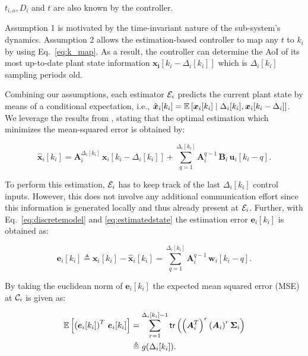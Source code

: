 \begin{theorem}
  $t_{i,o}, D_i$ and $t$ are also known by the controller. 
\end{theorem}

Assumption 1 is motivated by the time-invariant nature of the sub-system's
dynamics. Assumption 2 allows the estimation-based controller to map any $t$ to
$k_i$ by using Eq.~\eqref{eq:k_map}. As a result, the controller can determine
the AoI of its most up-to-date plant state information $\boldsymbol{x_i}[k_i -
\Delta_i[k_i]]$ which is $\Delta_i[k_i]$ sampling periods old.

Combining our assumptions, each estimator $\mathcal{E}_i$ predicts the current
plant state by means of a conditional expectation, i.e.,
$\hat{\boldsymbol{x}}_i[k_i] = \mathbb{E}\left[\boldsymbol{x}_i[k_i] \mid \Delta_i[k_i],
\boldsymbol{x}_i[k_i-\Delta_i] \right]$. We leverage the results from
\cite{ayan2019age}, stating that the optimal estimation which minimizes the
mean-squared error is obtained by:

\begin{equation}
  \label{eq:estimatedstate}
    \boldsymbol{\hat{x}}_i[k_i] = \boldsymbol{A}_i^{\Delta_i[k_i]} \,  \boldsymbol{x}_i[k_i - \Delta_i[k_i]] + \sum_{q=1}^{\Delta_i[k_i]} \boldsymbol{A}_i^{q - 1} \, \boldsymbol{B}_i \, \boldsymbol{u}_i [k_i - q].
\end{equation}

To perform this estimation, $\mathcal{E}_i$ has to keep track of the last
$\Delta_i[k_i]$ control inputs. However, this does not involve any additional
communication effort since this information is generated locally and thus
already present at $\mathcal{E}_i$. Further, with Eq.~\eqref{eq:discretemodel} and
\eqref{eq:estimatedstate} the estimation error $\boldsymbol{e}_i[k_i]$ is
obtained as:

\begin{equation}
  \boldsymbol{e}_i[k_i] \triangleq \boldsymbol{x}_i[k_i] - \boldsymbol{\hat{x}}_i[k_i] = \sum_{q=1}^{\Delta_i[k_i]} \boldsymbol{A}_i^{q-1} \, \boldsymbol{w}_i[k_i - q].
\end{equation}

By taking the euclidean norm of $\boldsymbol{e}_i[k_i]$ the expected mean
squared error (MSE) at $\mathcal{C}_i$ is given as:

\begin{align}
  \label{eq:estimationerror}
  \mathbb{E} \left[ \left(\boldsymbol{e}_i[k_i]\right)^T \, \boldsymbol{e}_i[k_i]\right] & = \sum_{r=1}^{\Delta_i[k_i] - 1} \mathsf{tr} \left( \left(\boldsymbol{A}_i^T\right)^r  \left(\boldsymbol{A}_i \right)^r \boldsymbol{\Sigma}_i \right) \\ \nonumber
  & \triangleq g(\Delta_i[k_i]).
\end{align}

